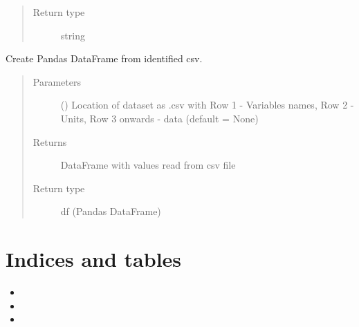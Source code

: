 \documentclass[letterpaper,10pt,english]{sphinxmanual}
\begin{document}
\begin{fulllineitems}
\begin{fulllineitems}
\begin{quote}
\begin{description}
\item[{Return type}] \leavevmode
string

\end{description}\end{quote}

\end{fulllineitems}


\begin{fulllineitems}
\label{\detokenize{index:kChain.kChainModel.getDataset}}
Create Pandas DataFrame from identified csv.
\begin{quote}\begin{description}
\item[{Parameters}] \leavevmode
{} () \textendash{} Location of dataset as .csv with Row 1 - Variables names,
Row 2 - Units, Row 3 onwards - data (default = None)

\item[{Returns}] \leavevmode
DataFrame with values read from csv file

\item[{Return type}] \leavevmode
df (Pandas DataFrame)

\end{description}\end{quote}

\end{fulllineitems}


\end{fulllineitems}



\chapter{Indices and tables}
\label{\detokenize{index:indices-and-tables}}\begin{itemize}
\item {} 

\item {} 

\item {} 

\end{itemize}


\renewcommand{\indexname}{Python Module Index}
\begin{sphinxtheindex}
\let\bigletter\sphinxstyleindexlettergroup
\bigletter{k}
\item\relax{}
\end{sphinxtheindex}

\renewcommand{\indexname}{Index}
\printindex
\end{document}
